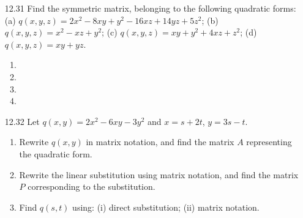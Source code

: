 \documentclass[12pt]{article}
\theoremstyle{definition}
\theoremstyle{plain}
\begin{document}
\begin{enumerate}
\begin{enumerate}
	\item
	\item
	\end{enumerate}		
\item[12.31]Find the symmetric matrix, belonging to the following quadratic forms:\\
(a) $q(x,y,z)=2x^2-8xy+y^2-16xz+14yz+5z^2$; (b) $q(x,y,z)=x^2-xz+y^2$; (c) $q(x,y,z)=xy+y^2+4xz+z^2$; (d) $q(x,y,z)=xy+yz$.
	\begin{enumerate}
	\item
	\item
	\item
	\item
	\end{enumerate}		
\item[12.32]Let $q(x,y)=2x^2-6xy-3y^2$ and $x=s+2t$, $y=3s-t$.
	\begin{enumerate}
	\item Rewrite $q(x,y)$ in matrix notation, and find the matrix $A$ representing the quadratic form.
	\item Rewrite the linear substitution using matrix notation, and find the matrix $P$ corresponding to the substitution.
	\item Find $q(s,t)$ using: (i) direct substitution; (ii) matrix notation.
	\end{enumerate}		
	
\end{enumerate}	
\end{document}
